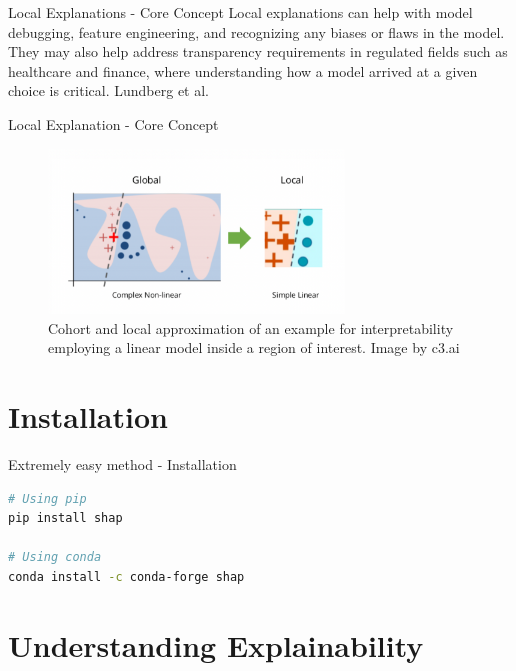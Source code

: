 \documentclass[aspectratio=169]{beamer}
\begin{document}
\begin{frame}{Local Explanations - Core Concept}
    Local explanations can help with model debugging, feature engineering, and recognizing any biases or flaws in the model. They may also help address transparency requirements in regulated fields such as healthcare and finance, where understanding how a model arrived at a given choice is critical. Lundberg et al. \cite{Lundberg2020}
\end{frame}

\begin{frame}{Local Explanation - Core Concept}
    \begin{figure}[htbp]
        \centering
        \includegraphics[width=0.7\textwidth]{figs/xai/local_explanation.png}
        \caption{Cohort and local approximation of an example for interpretability employing a linear model inside a region of interest. Image by c3.ai}
        \label{fig:local-explanation}
    \end{figure}
\end{frame}

\section{Installation}

\begin{frame}[fragile]{Extremely easy method - Installation}

\begin{lstlisting}[language=bash]
# Using pip
pip install shap

# Using conda
conda install -c conda-forge shap
\end{lstlisting}
    
\end{frame}

\section{Understanding Explainability}
\end{document}
